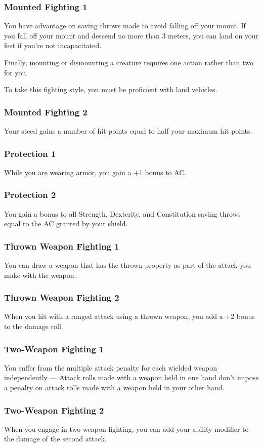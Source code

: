 \subsubsection{Mounted Fighting 1}
    You have advantage on saving throws made to avoid falling off your mount.
    If you fall off your mount and descend no more than 3 meters, you can land on your feet if you're not incapacitated.

    Finally, mounting or dismounting a creature requires one action rather than two for you.

    To take this fighting style, you must be proficient with land vehicles.
\subsubsection{Mounted Fighting 2}
    Your steed gains a number of hit points equal to half your maximum hit points.
\subsubsection{Protection 1}
    While you are wearing armor, you gain a +1 bonus to AC.
\subsubsection{Protection 2}
    You gain a bonus to all Strength, Dexterity, and Constitution saving throws equal to the AC granted by your shield.
\subsubsection{Thrown Weapon Fighting 1}
    You can draw a weapon that has the thrown property as part of the attack you make with the weapon.
\subsubsection{Thrown Weapon Fighting 2}
    When you hit with a ranged attack using a thrown weapon, you add a +2 bonus to the damage roll.
\subsubsection{Two-Weapon Fighting 1}
    You suffer from the multiple attack penalty for each wielded weapon independently --- Attack rolls made with a weapon held in one hand don't impose a penalty on attack rolls made with a weapon held in your other hand.
\subsubsection{Two-Weapon Fighting 2}
    When you engage in two-weapon fighting, you can add your ability modifier to the damage of the second attack.
